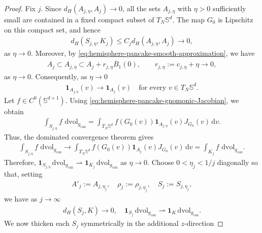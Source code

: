 \documentclass[11pt,reqno]{amsart}
\numberwithin{equation}{section}
\theoremstyle{definition}
\theoremstyle{remark}
\def\bS {\mathbb{S}}
\newcommand{\wto}{\rightharpoonup}
\newcommand{\ud}{\mathrm{d}}
\newcommand{\0}{\emptyset}
\newcommand{\can}{\mathrm{can}}
\newcommand{\dvol}{\,\mathrm{dvol}}
\begin{document}
\begin{proof}
Fix $j$. Since
$d_H(A_{j,\eta},A_j)\to0$, all the sets $A_{j,\eta}$ with $\eta>0$
sufficiently small are contained in a fixed compact subset of
$T_N\bS^d$. The map $G_0$ is Lipschitz on this compact set, and hence
\begin{align}
        d_H(S_{j,\eta},K_j)
        \leq
        C_jd_H(A_{j,\eta},A_j)
        \rightarrow
        0,
\end{align}
as $\eta\to 0$. Moreover, by
\eqref{eq:hemisphere-pancake-smooth-approximation}, we have
\begin{align}
        A_j
        \subset
        A_{j,\eta}
        \subset
        A_j+r_{j,\eta}\overline B_1(0),
        \qquad
        r_{j,\eta}
        :=
        c_{j,\eta}+\eta
        \rightarrow
        0,
\end{align}
as $\eta\to 0.$ Consequently, as $\eta \to 0$
\begin{align}
        \mathbf{1}_{A_{j,\eta}}(v)
        \rightarrow
        \mathbf{1}_{A_j}(v)
        \quad
        \text{for every }v\in T_N\bS^d.
\end{align}
Let $f\in C^0(\bS^{d+1})$. Using
\eqref{eq:hemisphere-pancake-gnomonic-Jacobian}, we obtain
\begin{align}
        \int_{S_{j,\eta}}f\,\dvol_{g_{\can}}
        =
        \int_{T_N\bS^d}
        f(G_0(v))
        \mathbf{1}_{A_{j,\eta}}(v)
        J_{G_0}(v)\,\ud v.
\end{align}
Thus, the dominated convergence theorem gives
\begin{align}
        \int_{S_{j,\eta}}f\,\dvol_{g_{\can}}
        \rightarrow
        \int_{T_N\bS^d}
        f(G_0(v))
        \mathbf{1}_{A_j}(v)
        J_{G_0}(v)\,\ud v
        =
        \int_{K_j}f\,\dvol_{g_{\can}}.
\end{align}
Therefore, $ \mathbf{1}_{S_{j,\eta}}\dvol_{g_{\can}} \wto \mathbf{1}_{K_j}\dvol_{g_{\can}}$ as $\eta \to 0$. Choose $0<\eta_j<1/j$ diagonally so that, setting
\begin{align}
        A'_j
        :=
        A_{j,\eta_j},
        \quad 
        \rho_j
        :=
        \rho_{j,\eta_j},
        \quad 
        S_j
        :=
        S_{j,\eta_j},
\end{align}
we have as $j\to \infty$
\begin{align}\label{eq:hemisphere-pancake-smooth-limit}
        d_H(S_j,K)
        \rightarrow
        0,
        \quad
        \mathbf{1}_{S_j}\dvol_{g_{\can}}
        \wto
        \mathbf{1}_K\dvol_{g_{\can}}.
\end{align}
We now thicken each $S_j$ symmetrically in the additional $z$-direction

\end{proof}
\end{document}
